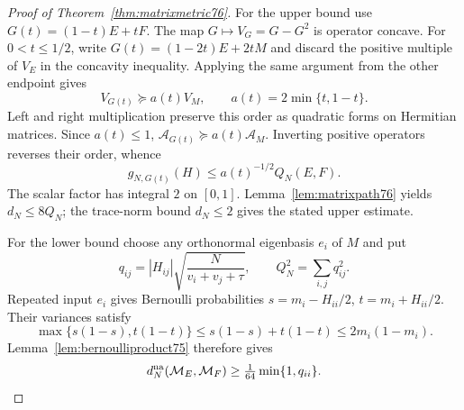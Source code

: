 \begin{proof}[Proof of Theorem~\ref{thm:matrixmetric76}]
For the upper bound use $G(t)=(1-t)E+tF$.  The map
$G\mapsto V_G=G-G^2$ is operator concave.  For $0<t\le1/2$,
write $G(t)=(1-2t)E+2tM$ and discard the positive multiple of
$V_E$ in the concavity inequality.  Applying the same argument
from the other endpoint gives
\begin{equation}\label{eq:midpointvariance76}
 V_{G(t)}\succeq a(t)V_M,\qquad
             a(t)=2\min\{t,1-t\}.
\end{equation}
Left and right multiplication preserve this order as quadratic
forms on Hermitian matrices.  Since $a(t)\le1$,
$\mathcal A_{G(t)}\succeq a(t)\mathcal A_M$.
Inverting positive operators reverses their order, whence
\[
 g_{N,G(t)}(H)\le a(t)^{-1/2}Q_N(E,F).
\]
The scalar factor has integral $2$ on $[0,1]$.
Lemma~\ref{lem:matrixpath76} yields $d_N\le8Q_N$;
the trace-norm bound $d_N\le2$ gives the stated upper estimate.

For the lower bound choose any orthonormal eigenbasis $e_i$ of
$M$ and put
\begin{equation}\label{eq:matrixentries76}
 q_{ij}=|H_{ij}|\sqrt{\frac N{v_i+v_j+\tau}},
                 \qquad Q_N^2=\sum_{i,j}q_{ij}^2.
\end{equation}
Repeated input $e_i$ gives Bernoulli probabilities
$s=m_i-H_{ii}/2$, $t=m_i+H_{ii}/2$.  Their variances satisfy
\[
 \max\{s(1-s),t(1-t)\}
 \le s(1-s)+t(1-t)\le2m_i(1-m_i).
\]
Lemma~\ref{lem:bernoulliproduct75} therefore gives
\begin{equation}\label{eq:matrixdiagonallower76}
 d_N^{\rm na}(\mathcal M_E,\mathcal M_F)
                            \ge\tfrac1{64}\min\{1,q_{ii}\}.
\end{equation}


\end{proof}
